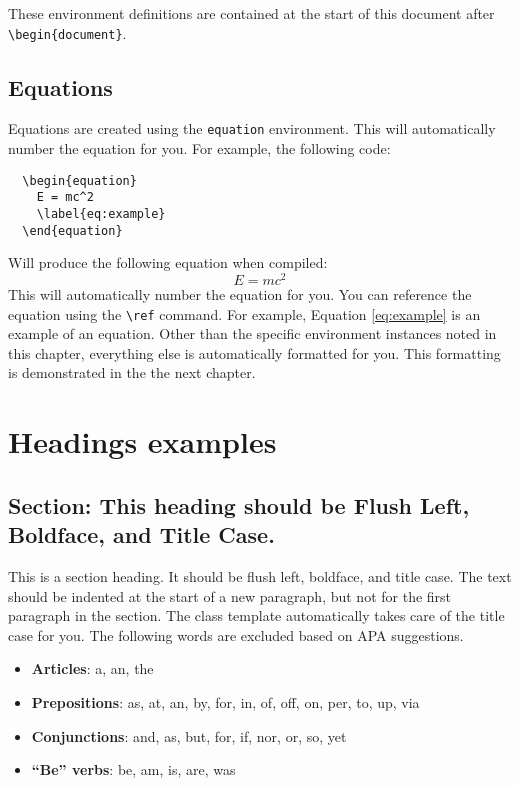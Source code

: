 \documentclass{thesis-dissertation}
\begin{document}
These environment definitions are contained at the start of this document after \verb|\begin{document}|.

\section{Equations}
Equations are created using the \texttt{equation} environment. This will automatically number the equation for you. For example, the following code: \begin{singlespace}
  \begin{verbatim}  
  \begin{equation}
    E = mc^2
    \label{eq:example}
  \end{equation}
  \end{verbatim}\end{singlespace} Will produce the following equation when compiled: \begin{equation}
  E = mc^2
  \label{eq:example}
\end{equation} This will automatically number the equation for you. You can reference the equation using the \verb|\ref| command. For example, Equation \ref{eq:example} is an example of an equation.
Other than the specific environment instances noted in this chapter, everything else is automatically formatted for you. This formatting is demonstrated in the the next chapter.
\chapter{Headings examples}
\section{Section: This heading should be Flush Left, Boldface, and Title Case.}
This is a section heading. It should be flush left, boldface, and title case. The text should be indented at the start of a new paragraph, but not for the first paragraph in the section. The class template automatically takes care of the title case for you. The following words are excluded based on APA suggestions. 
\begin{itemize}
  \item \textbf{Articles}: a, an, the
  \item \textbf{Prepositions}: as, at, an, by, for, in, of, off, on, per, to, up, via
  \item \textbf{Conjunctions}: and, as, but, for, if, nor, or, so, yet
  \item \textbf{``Be'' verbs}: be, am, is, are, was
\end{itemize}
\end{document}
